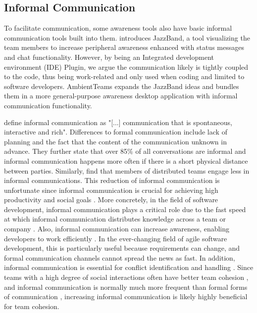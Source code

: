 \subsection{Informal Communication}
To facilitate communication, some awareness tools also have basic informal communication tools built into them. \textcite{cheng2003jazzing} introduces JazzBand, a tool visualizing the team members to increase peripheral awareness enhanced with status messages and chat functionality. However, by being an Integrated development environment (IDE) Plugin, we argue the communication likely is tightly coupled to the code, thus being work-related and only used when coding and limited to software developers. AmbientTeams expands the JazzBand ideas and bundles them in a more general-purpose awareness desktop application with informal communication functionality.

\textcite{kraut1990informal} define informal communication as "[...] communication that is spontaneous, interactive and rich". Differences to formal communication include lack of planning and the fact that the content of the communication unknown in advance. They further state that over 85\% of all conversations are informal and informal communication happens more often if there is a short physical distance between parties. Similarly, \textcite{hinds2005understanding} find that members of distributed teams engage less in informal communications. This reduction of informal communication is unfortunate since informal communication is crucial for achieving high productivity and social goals \autocite{kraut1990informal}. More concretely, in the field of software development, informal communication plays a critical role due to the fast speed at which informal communication distributes knowledge across a team or company \autocite{french1998study, mockus2001challenges}. Also, informal communication can increase awareness, enabling developers to work efficiently \autocite{herbsleb2001global}. In the ever-changing field of agile software development, this is particularly useful because requirements can change, and formal communication channels cannot spread the news as fast. In addition, informal communication is essential for conflict identification and handling \autocite{hinds2005understanding}. Since teams with a high degree of social interactions often have better team cohesion \autocite{staehle2014management}, and informal communication is normally much more frequent than formal forms of communication \autocite{kraut1990informal}, increasing informal communication is likely highly beneficial for team cohesion.

